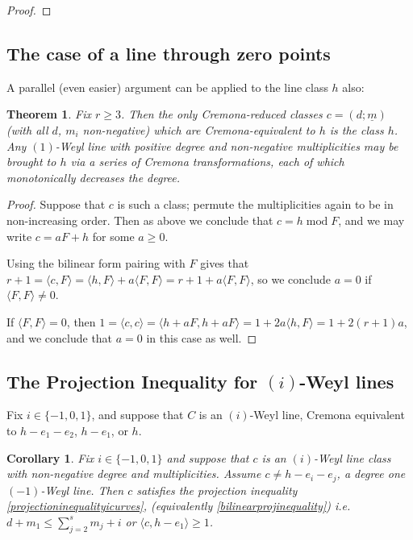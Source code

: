 \documentclass[12pt]{article}
\numberwithin{equation}{section}
\newtheorem{theorem}[equation]{Theorem}
\newtheorem{corollary}[equation]{Corollary}
\numberwithin{equation}{section}
\numberwithin{subeq}{equation}
\def\mod{\text{mod}\;}
\begin{document}
\begin{proof}
\end{proof}


\subsection{The case of a line through zero points}
A parallel (even easier) argument can be applied to the line class $h$ also:

\begin{theorem}\label{thm:1weyllines}
Fix $r\geq 3$.
Then the only Cremona-reduced classes $c = (d;\underline{m})$
(with all $d$, $m_i$ non-negative)
which are Cremona-equivalent to $h$
is the class $h$.
Any $(1)$-Weyl line with positive degree and non-negative multiplicities
may be brought to $h$ via a series of Cremona transformations,
each of which monotonically decreases the degree.

\end{theorem}

\begin{proof}
Suppose that $c$ is such a class; permute the multiplicities again to be in non-increasing order.
Then as above we conclude that $c = h \;\mod F$,
and we may write $c = aF + h$ for some $a \geq 0$.

Using the bilinear form pairing with $F$ gives that
$r+1 = \langle c, F\rangle = \langle h,F\rangle + a\langle F,F\rangle
= r+1+ a\langle F,F\rangle$,
so we conclude $a=0$ if $\langle F,F\rangle \neq 0$.

If $\langle F,F \rangle = 0$, then
$1 = \langle c,c\rangle = \langle h+aF,h+aF\rangle = 1 + 2a\langle h,F\rangle = 1+2(r+1)a$,
and we conclude that $a=0$ in this case as well.
\end{proof}

\subsection{The Projection Inequality for $(i)$-Weyl lines}

Fix $i \in \{-1,0,1\}$, and suppose that $C$ is an $(i)$-Weyl line,
Cremona equivalent to $h-e_1-e_2$, $h-e_1$, or $h$.

\begin{corollary}\label{projinequalityalliWeyllines}
Fix $i \in \{-1,0,1\}$ and suppose that $c$ is an $(i)$-Weyl line class with non-negative degree and multiplicities.
Assume $c \neq h-e_i-e_j$, a degree one $(-1)$-Weyl line.
Then $c$ satisfies the projection inequality \eqref{projectioninequalityicurves},
(equivalently \eqref{bilinearprojinequality})
i.e.
$d + m_1 \leq \sum_{j=2}^s m_j +i$
or
$\langle c, h-e_1\rangle \geq 1$.
\end{corollary}
\end{document}
